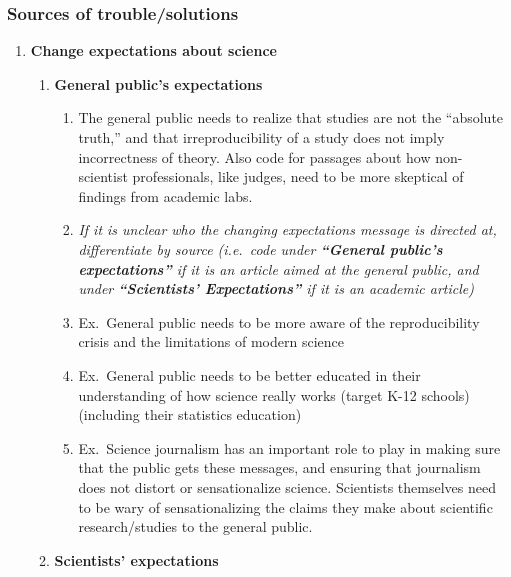 \documentclass[
]{scrartcl}
\begin{document}
\hypertarget{sources-of-troublesolutions}{%
\subsubsection{Sources of
trouble/solutions}\label{sources-of-troublesolutions}}

\begin{enumerate}
\def\labelenumi{\arabic{enumi}.}
\item
  \textbf{Change expectations about science}

  \begin{enumerate}

  \item
    \textbf{General public's expectations}

    \begin{enumerate}
    
    \item
      The general public needs to realize that studies are not the
      ``absolute truth,'' and that irreproducibility of a study does not
      imply incorrectness of theory. Also code for passages about how
      non-scientist professionals, like judges, need to be more
      skeptical of findings from academic labs.
    \item
      \emph{If it is unclear who the changing expectations message is
      directed at, differentiate by source (i.e.~code under
      \textbf{``General public's expectations''} if it is an article
      aimed at the general public, and under \textbf{``Scientists'
      Expectations''} if it is an academic article)}
    \item
      Ex.~General public needs to be more aware of the reproducibility
      crisis and the limitations of modern science
    \item
      Ex.~General public needs to be better educated in their
      understanding of how science really works (target K-12 schools)
      (including their statistics education)
    \item
      Ex.~Science journalism has an important role to play in making
      sure that the public gets these messages, and ensuring that
      journalism does not distort or sensationalize science. Scientists
      themselves need to be wary of sensationalizing the claims they
      make about scientific research/studies to the general public.
    \end{enumerate}
  \item
    \textbf{Scientists' expectations}


\end{enumerate}
\end{enumerate}
\end{document}
